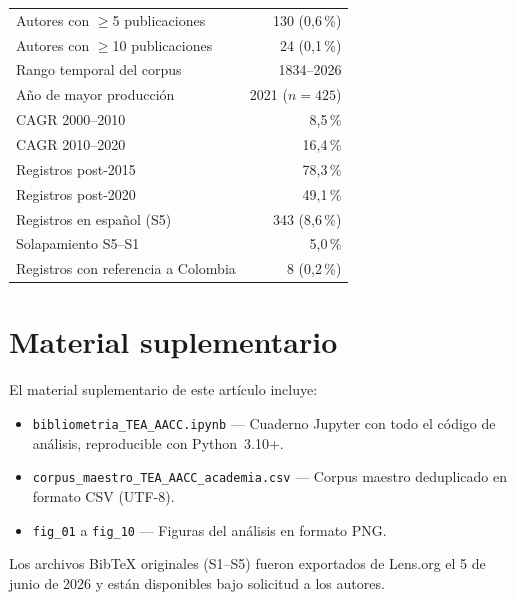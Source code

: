 \documentclass[12pt, a4paper]{article}
\begin{document}
\begin{table}[H]
\begin{tabular}{@{}lr@{}}
Autores con $\geq$5 publicaciones       & 130 (0,6\,\%) \\
Autores con $\geq$10 publicaciones      & 24 (0,1\,\%) \\
\midrule
Rango temporal del corpus               & 1834--2026 \\
Año de mayor producción                 & 2021 ($n=425$) \\
CAGR 2000--2010                         & 8,5\,\% \\
CAGR 2010--2020                         & 16,4\,\% \\
Registros post-2015                     & 78,3\,\% \\
Registros post-2020                     & 49,1\,\% \\
\midrule
Registros en español (S5)               & 343 (8,6\,\%) \\
Solapamiento S5--S1                     & 5,0\,\% \\
Registros con referencia a Colombia     & 8 (0,2\,\%) \\
\bottomrule
\end{tabular}
\end{table}

\section{Material suplementario}
\label{app:suplementario}

El material suplementario de este artículo incluye:

\begin{itemize}
    \item \texttt{bibliometria\_TEA\_AACC.ipynb} — Cuaderno Jupyter con todo el
    código de análisis, reproducible con Python~3.10+.
    \item \texttt{corpus\_maestro\_TEA\_AACC\_academia.csv} — Corpus maestro
    deduplicado en formato CSV (UTF-8).
    \item \texttt{fig\_01} a \texttt{fig\_10} — Figuras del análisis en formato PNG.
\end{itemize}

Los archivos BibTeX originales (S1--S5) fueron exportados de Lens.org el
5 de junio de 2026 y están disponibles bajo solicitud a los autores.
\end{document}
